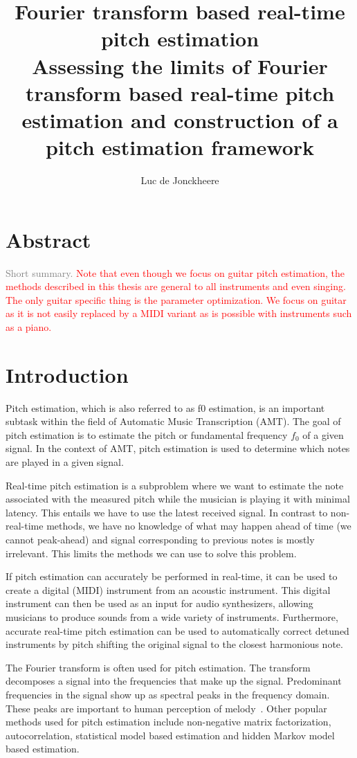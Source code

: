 \documentclass[10pt,twocolumn]{article}
\title{\textbf{Fourier transform based real-time pitch estimation}\\Assessing the limits of Fourier transform based real-time pitch estimation and construction of a pitch estimation framework}
\author{Luc de Jonckheere}
\begin{document}

\maketitle


\section*{Abstract}
\textcolor{gray}{Short summary.}
\textcolor{red}{Note that even though we focus on guitar pitch estimation, the methods described in this thesis are general to all instruments and even singing. The only guitar specific thing is the parameter optimization. We focus on guitar as it is not easily replaced by a MIDI variant as is possible with instruments such as a piano.}


\tableofcontents


\section{Introduction}
Pitch estimation, which is also referred to as f0 estimation, is an important subtask within the field of Automatic Music Transcription (AMT). The goal of pitch estimation is to estimate the pitch or fundamental frequency $f_0$ of a given signal. In the context of AMT, pitch estimation is used to determine which notes are played in a given signal.

Real-time pitch estimation is a subproblem where we want to estimate the note associated with the measured pitch while the musician is playing it with minimal latency. This entails we have to use the latest received signal. In contrast to non-real-time methods, we have no knowledge of what may happen ahead of time (we cannot peak-ahead) and signal corresponding to previous notes is mostly irrelevant. This limits the methods we can use to solve this problem.

If pitch estimation can accurately be performed in real-time, it can be used to create a digital (MIDI) instrument from an acoustic instrument. This digital instrument can then be used as an input for audio synthesizers, allowing musicians to produce sounds from a wide variety of instruments. Furthermore, accurate real-time pitch estimation can be used to automatically correct detuned instruments by pitch shifting the original signal to the closest harmonious note.

The Fourier transform is often used for pitch estimation. The transform decomposes a signal into the frequencies that make up the signal. Predominant frequencies in the signal show up as spectral peaks in the frequency domain. These peaks are important to human perception of melody~\cite{hearing}. %
Other popular methods used for pitch estimation include non-negative matrix factorization, autocorrelation, statistical model based estimation and hidden Markov model based estimation.
\end{document}
